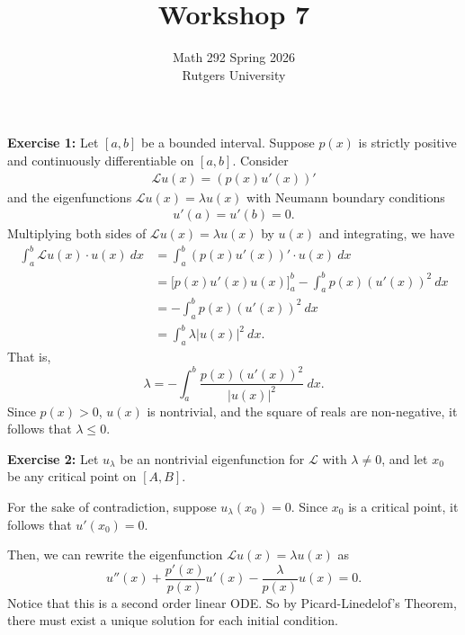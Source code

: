 \documentclass[12pt]{article}
\title{Workshop 7}
\author{Math 292 Spring 2026 \\ Rutgers University}
\date{}
\begin{document}
\maketitle

\noindent{}\textbf{Exercise 1:}
Let $[a,b]$ be a bounded interval.
Suppose $p(x)$ is strictly positive and continuously differentiable on $[a,b]$.
Consider
\begin{align*}
    \mathcal{L}u(x) = (p(x)u'(x))'
\end{align*}
and the eigenfunctions $\mathcal{L}u(x) = \lambda u(x)$ with Neumann boundary conditions
\begin{align*}
    u'(a) = u'(b) = 0.
\end{align*}
Multiplying both sides of $\mathcal{L}u(x) = \lambda u(x)$ by $u(x)$ and integrating, we have
\begin{align*}
    \int_a^b \mathcal{L}u(x) \cdot u(x) ~ dx & =  \int_a^b (p(x)u'(x))' \cdot u(x)  ~ dx                       \\
                                             & =   \Big[p(x) u'(x) u(x)\Big]^b_a - \int_a^b p(x)(u'(x))^2 ~ dx \\
                                             & = - \int_a^b p(x)(u'(x))^2 ~ dx                                 \\
                                             & = \int_a^b \lambda |u(x)|^2 ~ dx.
\end{align*}
That is,
\begin{equation*}
    \lambda = -\int_a^b\frac{ p(x)(u'(x))^2}{|u(x)|^2} ~ dx.
\end{equation*}
Since $p(x) > 0$, $u(x)$ is nontrivial, and the square of reals are non-negative, it follows that $\lambda \leq 0$.

\vspace{5ex}

\noindent{}\textbf{Exercise 2:}
Let $u_\lambda$ be an nontrivial eigenfunction for $\mathcal{L}$ with $\lambda \neq 0$, and let $x_0$ be any critical point on $[A, B]$.

For the sake of contradiction, suppose $u_\lambda(x_0) = 0$. Since $x_0$ is a critical point, it follows that $u'(x_0) = 0$.

Then, we can rewrite the eigenfunction $\mathcal{L}u(x) = \lambda u(x)$ as
\begin{equation}
    u''(x) + \frac{p'(x)}{p(x)}u'(x) - \frac{\lambda}{p(x)}u(x) = 0.
\end{equation}
Notice that this is a second order linear ODE.
So by Picard-Linedelof's Theorem, there must exist a unique solution for each initial condition.
\end{document}
